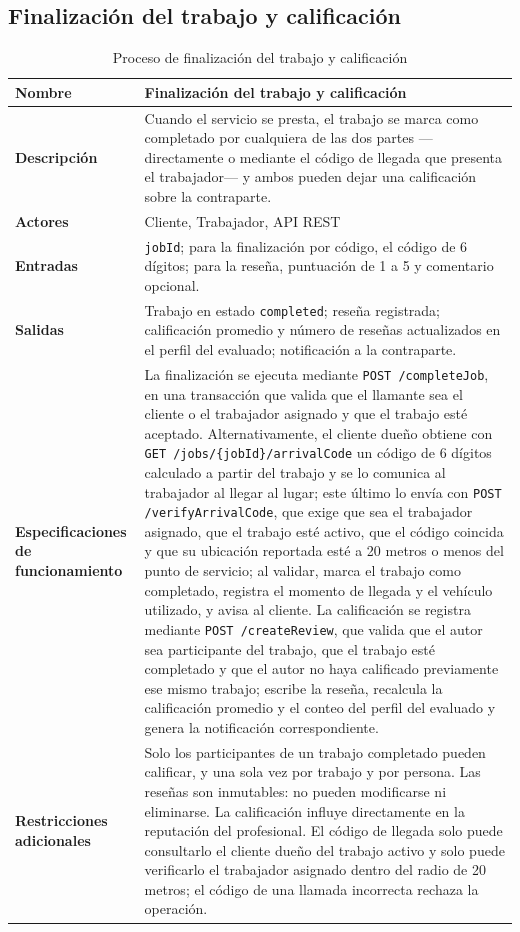 \documentclass[doc,12pt,a4paper]{apa7}
\begin{document}
\subsection{Finalización del trabajo y calificación}

\begin{longtable}{|P{3.3cm}|L{11.2cm}|}
\caption{Proceso de finalización del trabajo y calificación}\\
\hline
\textbf{Nombre} & Finalización del trabajo y calificación \\ \hline
\textbf{Descripción} & Cuando el servicio se presta, el trabajo se marca como completado por cualquiera de las dos partes —directamente o mediante el código de llegada que presenta el trabajador— y ambos pueden dejar una calificación sobre la contraparte. \\ \hline
\textbf{Actores} & Cliente, Trabajador, API REST \\ \hline
\textbf{Entradas} & \texttt{jobId}; para la finalización por código, el código de 6 dígitos; para la reseña, puntuación de 1 a 5 y comentario opcional. \\ \hline
\textbf{Salidas} & Trabajo en estado \texttt{completed}; reseña registrada; calificación promedio y número de reseñas actualizados en el perfil del evaluado; notificación a la contraparte. \\ \hline
\textbf{Especificaciones de funcionamiento} & La finalización se ejecuta mediante \texttt{POST /completeJob}, en una transacción que valida que el llamante sea el cliente o el trabajador asignado y que el trabajo esté aceptado. Alternativamente, el cliente dueño obtiene con \texttt{GET /jobs/\{jobId\}/arrivalCode} un código de 6 dígitos calculado a partir del trabajo y se lo comunica al trabajador al llegar al lugar; este último lo envía con \texttt{POST /verifyArrivalCode}, que exige que sea el trabajador asignado, que el trabajo esté activo, que el código coincida y que su ubicación reportada esté a 20 metros o menos del punto de servicio; al validar, marca el trabajo como completado, registra el momento de llegada y el vehículo utilizado, y avisa al cliente. La calificación se registra mediante \texttt{POST /createReview}, que valida que el autor sea participante del trabajo, que el trabajo esté completado y que el autor no haya calificado previamente ese mismo trabajo; escribe la reseña, recalcula la calificación promedio y el conteo del perfil del evaluado y genera la notificación correspondiente. \\ \hline
\textbf{Restricciones adicionales} & Solo los participantes de un trabajo completado pueden calificar, y una sola vez por trabajo y por persona. Las reseñas son inmutables: no pueden modificarse ni eliminarse. La calificación influye directamente en la reputación del profesional. El código de llegada solo puede consultarlo el cliente dueño del trabajo activo y solo puede verificarlo el trabajador asignado dentro del radio de 20 metros; el código de una llamada incorrecta rechaza la operación. \\ \hline
\end{longtable}
\end{document}
